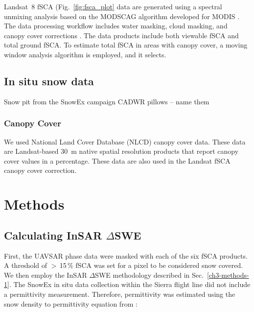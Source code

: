 Landsat~8 fSCA (Fig.~\ref{fig:fsca_plot} \citep{u.s.geologicalsurveyearthresourcesobservationandsciencecenterCollection1LandsatLevel32018} data are generated using a spectral unmixing analysis based on the MODSCAG algorithm developed for MODIS \citep{painterRetrievalSubpixelSnow2009}. The data processing workflow includes water masking, cloud masking, and canopy cover corrections \citep{selkowitzUSGSLandsatSnow2017, stillingerLandsatMODISVIIRS2023}. The data products include both viewable fSCA and total ground fSCA. To estimate total fSCA in areas with canopy cover, a moving window analysis algorithm is employed, and it selects.

\hypertarget{ch4-methods-8}{\subsection{In situ snow data}\label{ch4-methods-8}}

Snow pit from the SnowEx campaign
CADWR pillows -- name them

\hypertarget{ch4-methods-9}{\subsubsection{Canopy Cover}\label{ch4-methods-9}}

We used National Land Cover Database (NLCD) \citep{homerConterminousUnitedStates2020} canopy cover data. These data are Landsat-based 30~m native spatial resolution products that report canopy cover values in a percentage. These data are also used in the Landsat fSCA canopy cover correction.


\hypertarget{ch4-methods}{\section{Methods}\label{ch4-methods}}
\hypertarget{ch4-methods-1}{\subsection{Calculating InSAR $\Delta$SWE}\label{ch4-methods-1}}


First, the UAVSAR phase data were masked with each of the six fSCA products. A threshold of $>$\,15\,\% fSCA was set for a pixel to be considered snow covered. We then employ the InSAR $\Delta$SWE methodology described in Sec.~\ref{ch3-methods-1}. The SnowEx in situ data collection within the Sierra flight line did not include a permittivity measurement. Therefore, permittivity was estimated using the snow density to permittivity equation from \cite{guneriussenInSAREstimationChanges2001}:

